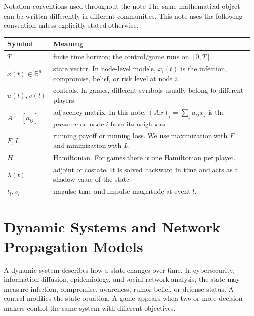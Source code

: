 \documentclass[11pt,a4paper]{article}
\begin{document}
\begin{definitionbox}{Notation conventions used throughout the note}
The same mathematical object can be written differently in different communities. This note uses the following convention unless explicitly stated otherwise.
\begin{center}
\begin{tabularx}{0.96\textwidth}{L{2.8cm}Y}
\toprule
\textbf{Symbol} & \textbf{Meaning} \\
\midrule
$T$ & finite time horizon; the control/game runs on $[0,T]$. \\
$x(t)\in\mathbb{R}^n$ & state vector. In node-level models, $x_i(t)$ is the infection, compromise, belief, or risk level at node $i$. \\
$u(t),v(t)$ & controls. In games, different symbols usually belong to different players. \\
$A=[a_{ij}]$ & adjacency matrix. In this note, $(A x)_i=\sum_j a_{ij}x_j$ is the pressure on node $i$ from its neighbors. \\
$F,L$ & running payoff or running loss. We use maximization with $F$ and minimization with $L$. \\
$H$ & Hamiltonian. For games there is one Hamiltonian per player. \\
$\lambda(t)$ & adjoint or costate. It is solved backward in time and acts as a shadow value of the state. \\
$t_l,v_l$ & impulse time and impulse magnitude at event $l$. \\
\bottomrule
\end{tabularx}
\end{center}
\end{definitionbox}

\section{Dynamic Systems and Network Propagation Models}

A dynamic system describes how a state changes over time. In cybersecurity, information diffusion, epidemiology, and social network analysis, the state may measure infection, compromise, awareness, rumor belief, or defense status. A control modifies the state equation. A game appears when two or more decision makers control the same system with different objectives.
\end{document}
